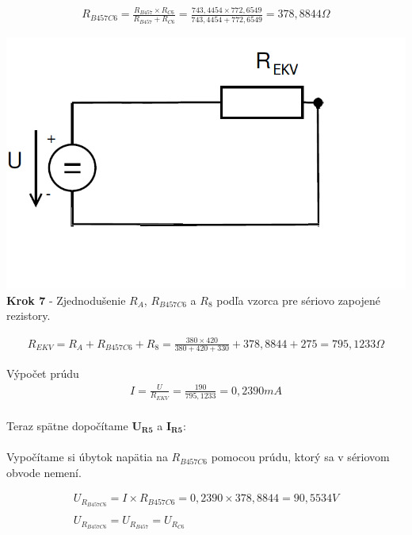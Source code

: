 \begin{gather*}
R_{B457C6}=\frac{R_{B457}  \times R_{C6}}{R_{B457}+R_{C6}}=\frac{743,4454  \times 772,6549}{743,4454+772,6549}=378,8844\Omega 
\end{gather*}

\begin{center}
\includegraphics[scale=0.5,keepaspectratio]{fig/obr/Pr1_7.png} \\
\textbf{Krok 7} - Zjednodušenie $R_{A}$, $R_{B457C6}$ a $R_{8}$ podľa vzorca pre sériovo zapojené rezistory.
\end{center}

\begin{gather*}
R_{EKV}=R_{A}+R_{B457C6}+R_{8}=\frac{380 \times 420}{380+420+330}+378,8844+275=795,1233\Omega 
\end{gather*}



Výpočet prúdu
\begin{gather*}
    I = \frac{U}{R_{EKV}} = \frac{190}{795,1233} = 0,2390mA \\
\end{gather*}

\newpage

\noindent Teraz spätne dopočítame $\boldsymbol{U_{R5}}$ a $\boldsymbol{I_{R5}}$:
\\\\
Vypočítame si úbytok napätia na $R_{B457C6}$ pomocou prúdu, ktorý sa v sériovom obvode nemení.

\begin{gather*}
    U_{R_{B457C6}} = I \times R_{B457C6} = 0,2390 \times 378,8844 = 90,5534V \\\\
   U_{R_{B457C6}} = U_{R_{B457}}=U_{R_{C6}} \\
\end{gather*}

